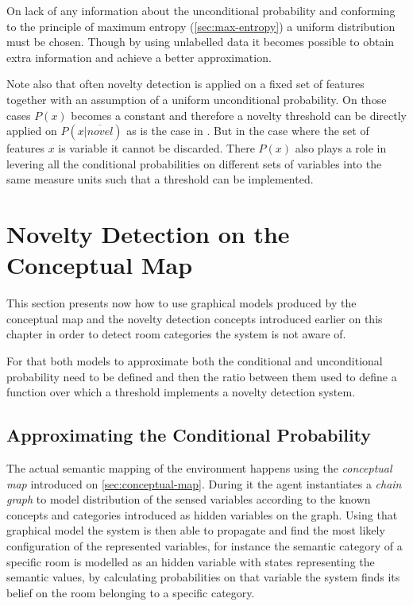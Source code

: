 On lack of any information about the unconditional probability and conforming to
the principle of maximum entropy (\autoref{sec:max-entropy}) a uniform
distribution must be chosen.
Though by using unlabelled data it becomes possible to obtain extra information
and achieve a better approximation.


Note also that often novelty detection is applied on a fixed set of features
together with an assumption of a uniform unconditional probability.
On those cases $P(x)$ becomes a constant and therefore a novelty threshold
can be directly applied on $P(x|\overline{novel})$ as is the case in \cite{bishop1994novelty}.
But in the case where the set of features $x$ is variable it cannot be
discarded. There $P(x)$ also plays a role in levering all the conditional
probabilities on different sets of variables into the same measure units
such that a threshold can be implemented.


\section{Novelty Detection on the Conceptual Map}

This section presents now how to use graphical models produced by the conceptual map and the
novelty detection concepts introduced earlier on this chapter in order to detect room categories the
system is not aware of.

For that both models to approximate both the conditional and unconditional probability need to
be defined and then the ratio between them used to define a function over which a threshold
implements a novelty detection system.

\subsection{Approximating the Conditional Probability}
The actual semantic mapping of the environment happens using the \emph{conceptual map}
introduced on \autoref{sec:conceptual-map}. During it the agent instantiates a
\emph{chain graph} to model distribution of the sensed variables according to the known
concepts and categories introduced as hidden variables on the graph. Using that graphical model
the system is then able to propagate and find the most likely configuration of the represented
variables, for instance the semantic category of a specific room is modelled as an hidden variable
with states representing the semantic values, by calculating probabilities on that variable the
system finds its belief on the room belonging to a specific category.

